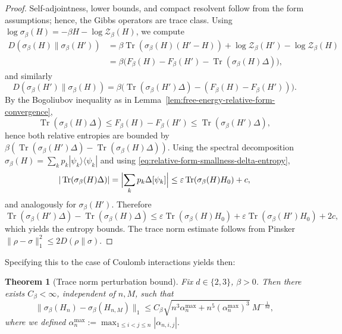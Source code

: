 \documentclass[11pt]{amsart}
\newcommand{\1}{\mathbbm{1}}
\newcommand{\Tr}{\operatorname{Tr}}
\theoremstyle{plain}
\newtheorem{theorem}{Theorem}[section]
\theoremstyle{definition}
\theoremstyle{remark}
\numberwithin{equation}{section}
\begin{document}
\begin{proof}
Self-adjointness, lower bounds, and compact resolvent follow from the form assumptions; hence, the Gibbs operators are trace class. Using \(\log\sigma_\beta(H)=-\beta H-\log\mathcal Z_\beta(H)\), we compute
\[\begin{split}
D(\sigma_\beta(H)\|\sigma_\beta(H'))&=\beta\Tr(\sigma_\beta(H)(H'-H))+\log\mathcal Z_\beta(H')-\log\mathcal Z_\beta(H)\\
&=\beta\bigl(F_\beta(H)-F_\beta(H')-\Tr(\sigma_\beta(H)\Delta)\bigr),
\end{split}
\]
and similarly
\[
D(\sigma_\beta(H')\|\sigma_\beta(H))=\beta\bigl(\Tr(\sigma_\beta(H')\Delta)-(F_\beta(H)-F_\beta(H'))\bigr).
\]
By the Bogoliubov inequality as in Lemma~\ref{lem:free-energy-relative-form-convergence},
\[
\Tr(\sigma_\beta(H)\Delta)\le F_\beta(H)-F_\beta(H')\le \Tr(\sigma_\beta(H')\Delta),
\]
hence both relative entropies are bounded by \(\beta(\Tr(\sigma_\beta(H')\Delta)-\Tr(\sigma_\beta(H)\Delta))\). Using the spectral decomposition \(\sigma_\beta(H)=\sum_k p_k|\psi_k\rangle\langle\psi_k|\) and using \eqref{eq:relative-form-smallness-delta-entropy},
\[
|\Tr(\sigma_\beta(H)\Delta)|=\Bigl|\sum_k p_k\Delta[\psi_k]\Bigr|\le \varepsilon\Tr(\sigma_\beta(H)H_0)+c,
\]
and analogously for \(\sigma_\beta(H')\). Therefore
\[
\Tr(\sigma_\beta(H')\Delta)-\Tr(\sigma_\beta(H)\Delta)\le \varepsilon\Tr(\sigma_\beta(H)H_0)+\varepsilon\Tr(\sigma_\beta(H')H_0)+2c,
\]
which yields the entropy bounds. The trace norm estimate follows from Pinsker \(\|\rho-\sigma\|_1^2\le2D(\rho\|\sigma)\).
\end{proof}
\noindent Specifying this to the case of Coulomb interactions yields then:
\begin{theorem}[Trace norm perturbation bound]
\label{thm:trace-norm-perturbation-bound}
Fix \(d\in\{2,3\}\), \(\beta>0\). Then there exists \(C_\beta<\infty\), independent of \(n,M\), such that
\begin{equation}
\|\sigma_\beta(H_n)-\sigma_\beta(H_{n,M})\|_1 \le C_\beta \sqrt{n^3\alpha^{\max}_n + n^5(\alpha^{\max}_n)^3}\ M^{-\frac{1}{8d}},
\end{equation}
where we defined $\alpha^{\max}_{n} :=\max_{1\le i<j\le n} |\alpha_{n,i,j}|.$
\end{theorem}
\end{document}
